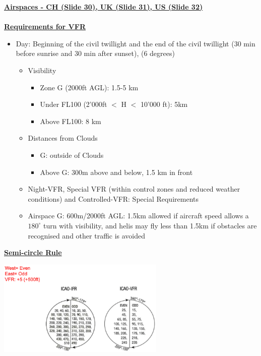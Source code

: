 \documentclass[9pt, landscape, fleqn]{scrartcl}
\begin{document}
\begin{multicols*}{3}
\begin{center}
\end{center}
\underline{\textbf{Airspaces - CH (Slide 30), UK (Slide 31), US (Slide 32)}} \\ \\
\underline{\textbf{Requirements for VFR}}
\begin{itemize}
    \item Day: Beginning of the civil twillight and the end of the civil twillight (30 min before sunrise and 30 min after sunset), (6 degrees)
    \begin{itemize}
        \item Visibility
        \begin{itemize}
            \item Zone G (2000ft AGL): 1.5-5 km 
            \item Under FL100 (2'000ft $<$ H $<$ 10'000 ft): 5km 
            \item Above FL100: 8 km
        \end{itemize}
        \item Distances from Clouds
        \begin{itemize}
            \item G: outside of Clouds 
            \item Above G: 300m above and below, 1.5 km in front 
        \end{itemize}
        \item Night-VFR, Special VFR (within control zones and reduced weather conditions) and Controlled-VFR: Special Requirements
        \item Airspace G: 600m/2000ft AGL: 1.5km allowed if aircraft speed allows a $180^\circ$ turn with visibility, and helis may fly less than 1.5km if obstacles are recognised and other traffic is avoided
    \end{itemize}
\end{itemize}
\underline{\textbf{Semi-circle Rule}}
\begin{center}
    \includegraphics[width=8cm]{Images/Semicircle_Rule.png}
\end{center}

\end{multicols*}
\end{document}
